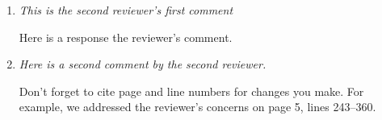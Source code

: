 \begin{enumerate}

  \item \textit{This is the second reviewer's first comment}
        \vspace{2ex}

        Here is a response the reviewer's comment.

        \vspace{2ex}
  \item \textit{Here is a second comment by the second reviewer.}
        \vspace{2ex}

        Don't forget to cite page and line numbers for changes you make.
        For example, we addressed the reviewer's concerns on page 5, lines 243--360.

        \vspace{2ex}
\end{enumerate}
